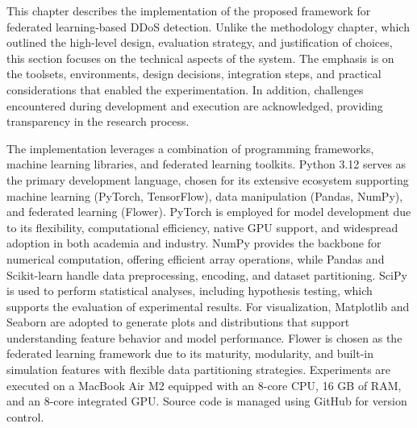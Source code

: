 This chapter describes the implementation of the proposed framework for federated learning-based DDoS detection. Unlike the methodology chapter, which outlined the high-level design, evaluation strategy, and justification of choices, this section focuses on the technical aspects of the system. The emphasis is on the toolsets, environments, design decisions, integration steps, and practical considerations that enabled the experimentation. In addition, challenges encountered during development and execution are acknowledged, providing transparency in the research process.

The implementation leverages a combination of programming frameworks, machine learning libraries, and federated learning toolkits. Python 3.12 \citep{python} serves as the primary development language, chosen for its extensive ecosystem supporting machine learning (PyTorch, TensorFlow), data manipulation (Pandas, NumPy), and federated learning (Flower). PyTorch \citep{pytorch} is employed for model development due to its flexibility, computational efficiency, native GPU support, and widespread adoption in both academia and industry. NumPy \citep{numpy} provides the backbone for numerical computation, offering efficient array operations, while Pandas \citep{pandas} and Scikit-learn \citep{sklearn} handle data preprocessing, encoding, and dataset partitioning. SciPy \citep{scipy} is used to perform statistical analyses, including hypothesis testing, which supports the evaluation of experimental results. For visualization, Matplotlib \citep{matplotlib} and Seaborn \citep{seaborn} are adopted to generate plots and distributions that support understanding feature behavior and model performance. Flower \citep{flower} is chosen as the federated learning framework due to its maturity, modularity, and built-in simulation features with flexible data partitioning strategies. Experiments are executed on a MacBook Air M2 equipped with an 8-core CPU, 16 GB of RAM, and an 8-core integrated GPU. Source code is managed using GitHub for version control.

